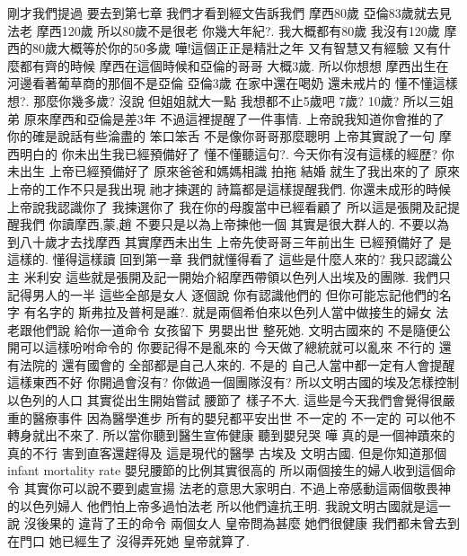 \documentclass{book}
\begin{document}
剛才我們提過 要去到第七章 我們才看到經文告訴我們 摩西80歲 亞倫83歲就去見法老 摩西120歲 所以80歲不是很老 你幾大年紀?.
我大概都有80歲 我沒有120歲 摩西的80歲大概等於你的50多歲 嘩!這個正正是精壯之年 又有智慧又有經驗 又有什麼都有齊的時候 摩西在這個時候和亞倫的哥哥 大概3歲.
所以你想想 摩西出生在河邊看著葡草商的那個不是亞倫 亞倫3歲 在家中還在喝奶 還未戒片的 懂不懂這樣想?.
那麼你幾多歲? 沒說 但姐姐就大一點 我想都不止5歲吧 7歲? 10歲? 所以三姐弟 原來摩西和亞倫是差3年 不過這裡提醒了一件事情.
上帝說我知道你會推的了 你的確是說話有些淪盡的 笨口笨舌 不是像你哥哥那麼聰明 上帝其實說了一句 摩西明白的 你未出生我已經預備好了 懂不懂聽這句?.
今天你有沒有這樣的經歷? 你未出生 上帝已經預備好了 原來爸爸和媽媽相識 拍拖 結婚 就生了我出來的了 原來上帝的工作不只是我出現 祂才揀選的 詩篇都是這樣提醒我們.
你還未成形的時候 上帝說我認識你了 我揀選你了 我在你的母腹當中已經看顧了 所以這是張開及記提醒我們 你讀摩西,蒙,趙 不要只是以為上帝揀他一個 其實是很大群人的.
不要以為到八十歲才去找摩西 其實摩西未出生 上帝先使哥哥三年前出生 已經預備好了 是這樣的.
懂得這樣讀 回到第一章 我們就懂得看了 這些是什麼人來的? 我只認識公主 米利安 這些就是張開及記一開始介紹摩西帶領以色列人出埃及的團隊.
我們只記得男人的一半 這些全部是女人 逐個說 你有認識他們的 但你可能忘記他們的名字 有名字的 斯弗拉及普柯是誰?.
就是兩個希伯來以色列人當中做接生的婦女 法老跟他們說 給你一道命令 女孩留下 男嬰出世 整死她.
文明古國來的 不是隨便公開可以這樣吩咐命令的 你要記得不是亂來的 今天做了總統就可以亂來 不行的 還有法院的 還有國會的 全部都是自己人來的.
不是的 自己人當中都一定有人會提醒 這樣東西不好 你開過會沒有? 你做過一個團隊沒有? 所以文明古國的埃及怎樣控制以色列的人口 其實從出生開始嘗試 腰節了 樣子不大.
這些是今天我們會覺得很嚴重的醫療事件 因為醫學進步 所有的嬰兒都平安出世 不一定的 不一定的 可以他不轉身就出不來了.
所以當你聽到醫生宣佈健康 聽到嬰兒哭 嘩 真的是一個神蹟來的 真的不行 害到直客還趕得及 這是現代的醫學 古埃及 文明古國.
但是你知道那個infant mortality rate 嬰兒腰節的比例其實很高的 所以兩個接生的婦人收到這個命令 其實你可以說不要到處宣揚 法老的意思大家明白.
不過上帝感動這兩個敬畏神的以色列婦人 他們怕上帝多過怕法老 所以他們違抗王明.
我說文明古國就是這一說 沒後果的 違背了王的命令 兩個女人 皇帝問為甚麼 她們很健康 我們都未曾去到 在門口 她已經生了 沒得弄死她 皇帝就算了.
\end{document}
